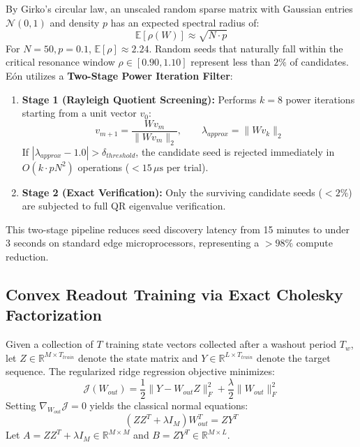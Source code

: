 By Girko's circular law, an unscaled random sparse matrix with Gaussian entries $\mathcal{N}(0, 1)$ and density $p$ has an expected spectral radius of:
\begin{equation}
    \mathbb{E}[\rho(W)] \approx \sqrt{N \cdot p}
\end{equation}
For $N=50, p=0.1$, $\mathbb{E}[\rho] \approx 2.24$. Random seeds that naturally fall within the critical resonance window $\rho \in [0.90, 1.10]$ represent less than $2\%$ of candidates. Eón utilizes a \textbf{Two-Stage Power Iteration Filter}:
\begin{enumerate}
    \item \textbf{Stage 1 (Rayleigh Quotient Screening):} Performs $k=8$ power iterations starting from a unit vector $v_0$:
    \begin{equation}
        v_{m+1} = \frac{W v_m}{\|W v_m\|_2}, \qquad \lambda_{approx} = \|W v_k\|_2
    \end{equation}
    If $|\lambda_{approx} - 1.0| > \delta_{threshold}$, the candidate seed is rejected immediately in $O(k \cdot p N^2)$ operations ($<15\,\mu\text{s}$ per trial).
    \item \textbf{Stage 2 (Exact Verification):} Only the surviving candidate seeds ($<2\%$) are subjected to full QR eigenvalue verification.
\end{enumerate}
This two-stage pipeline reduces seed discovery latency from 15 minutes to under 3 seconds on standard edge microprocessors, representing a $>98\%$ compute reduction.

\subsection{Convex Readout Training via Exact Cholesky Factorization}
Given a collection of $T$ training state vectors collected after a washout period $T_w$, let $Z \in \mathbb{R}^{M \times T_{train}}$ denote the state matrix and $Y \in \mathbb{R}^{L \times T_{train}}$ denote the target sequence. The regularized ridge regression objective minimizes:
\begin{equation}
    \mathcal{J}(W_{out}) = \frac{1}{2} \|Y - W_{out} Z\|_F^2 + \frac{\lambda}{2} \|W_{out}\|_F^2
    \label{eq:ridge_loss}
\end{equation}
Setting $\nabla_{W_{out}} \mathcal{J} = 0$ yields the classical normal equations:
\begin{equation}
    (Z Z^T + \lambda I_M) W_{out}^T = Z Y^T
    \label{eq:normal_eq}
\end{equation}
Let $A = Z Z^T + \lambda I_M \in \mathbb{R}^{M \times M}$ and $B = Z Y^T \in \mathbb{R}^{M \times L}$. 

